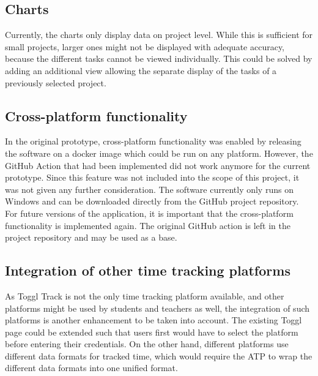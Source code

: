 \subsection{Charts}
Currently, the charts only display data on project level. While this is sufficient for small projects, larger ones might not be displayed with adequate accuracy, because the different tasks cannot be viewed individually. This could be solved by adding an additional view allowing the separate display of the tasks of a previously selected project.

\subsection{Cross-platform functionality}
In the original prototype, cross-platform functionality was enabled by releasing the software on a docker image which could be run on any platform. However, the GitHub Action that had been implemented did not work anymore for the current prototype. Since this feature was not included into the scope of this project, it was not given any further consideration. The software currently only runs on Windows and can be downloaded directly from the GitHub project repository. For future versions of the application, it is important that the cross-platform functionality is implemented again. The original GitHub action is left in the project repository and may be used as a base.

\subsection{Integration of other time tracking platforms}
As Toggl Track is not the only time tracking platform available, and other platforms might be used by students and teachers as well, the integration of such platforms is another enhancement to be taken into account. The existing Toggl page could be extended such that users first would have to select the platform before entering their credentials. On the other hand, different platforms use different data formats for tracked time, which would require the ATP to wrap the different data formats into one unified format.
